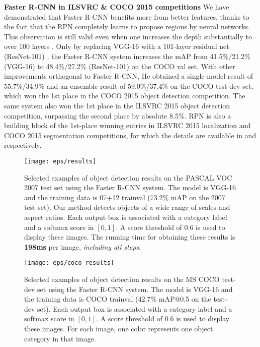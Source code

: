 \documentclass[10pt,journal,cspaper,compsoc]{IEEEtran}
\begin{document}
\vspace{.5em}
\noindent\textbf{Faster R-CNN in ILSVRC \& COCO 2015 competitions}
We have demonstrated that Faster R-CNN benefits more from better features, thanks to the fact that the RPN completely learns to propose regions by neural networks. This observation is still valid even when one increases the depth substantially to over 100 layers \cite{He2015a}. Only by replacing VGG-16 with a 101-layer residual net (ResNet-101) \cite{He2015a}, the Faster R-CNN system increases the mAP from 41.5\%/21.2\% (VGG-16) to 48.4\%/27.2\% (ResNet-101) on the COCO val set. With other improvements orthogonal to Faster R-CNN, He \etal \cite{He2015a} obtained a single-model result of 55.7\%/34.9\% and an ensemble result of 59.0\%/37.4\% on the COCO test-dev set, which won the 1st place in the COCO 2015 object detection competition. The same system \cite{He2015a} also won the 1st place in the ILSVRC 2015 object detection competition, surpassing the second place by absolute 8.5\%. RPN is also a building block of the 1st-place winning entries in ILSVRC 2015 localization and COCO 2015 segmentation competitions, for which the details are available in \cite{He2015a} and \cite{Dai2015a} respectively.

\begin{figure*}[t]
\centering
\texttt{[image: eps/results]}
\caption{Selected examples of object detection results on the PASCAL VOC 2007 test set using the Faster R-CNN system. The model is VGG-16 and the training data is 07+12 trainval (73.2\% mAP on the 2007 test set). Our method detects objects of a wide range of scales and aspect ratios. Each output box is associated with a category label and a softmax score in $[0,1]$. A score threshold of 0.6 is used to display these images. The running time for obtaining these results is \textbf{198ms} per image, \emph{including all steps}.}
\label{fig:results}
\end{figure*}

\begin{figure*}[t]
\centering
\texttt{[image: eps/coco\_results]}
\caption{Selected examples of object detection results on the MS COCO test-dev set using the Faster R-CNN system. The model is VGG-16 and the training data is COCO trainval (42.7\% mAP@0.5 on the test-dev set). Each output box is associated with a category label and a softmax score in $[0,1]$. A score threshold of 0.6 is used to display these images. For each image, one color represents one object category in that image.}
\label{fig:coco_results}
\end{figure*}
\end{document}

